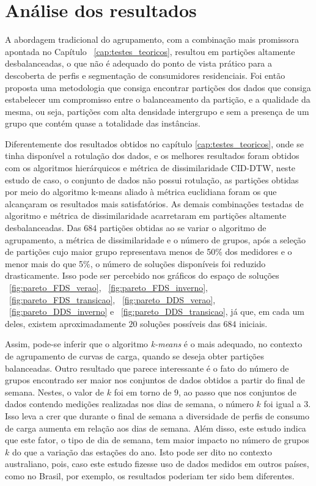 \section{Análise dos resultados}

A abordagem tradicional do agrupamento, com a combinação mais promissora apontada no Capítulo ~\ref{cap:testes_teoricos}, resultou em partições altamente desbalanceadas, o que não é adequado do ponto de vista prático para a descoberta de perfis e segmentação de consumidores residenciais. Foi então proposta uma metodologia que consiga encontrar partições dos dados que consiga estabelecer um compromisso entre o balanceamento da partição, e a qualidade da mesma, ou seja, partições com alta densidade intergrupo e sem a presença de um grupo que contém quase a totalidade das instâncias.

Diferentemente dos resultados obtidos no capítulo \ref{cap:testes_teoricos}, onde se tinha disponível a rotulação dos dados, e os melhores resultados foram obtidos com os algoritmos hierárquicos e métrica de dissimilaridade CID-DTW, neste estudo de caso, o conjunto de dados não possui rotulação, as partições obtidas por meio do algoritmo k-means aliado à métrica euclidiana foram os que alcançaram os resultados mais satisfatórios. As demais combinações testadas de algoritmo e métrica de dissimilaridade acarretaram em partições altamente desbalanceadas. Das $684$ partições obtidas ao se variar o algoritmo de agrupamento, a métrica de dissimilaridade e o número de grupos, após a seleção de partições cujo maior grupo representava menos de 50\% dos medidores e o menor mais do que 5\%, o número de soluções disponíveis foi reduzido drasticamente. Isso pode ser percebido nos gráficos do espaço de soluções ~\ref{fig:pareto_FDS_verao}, ~\ref{fig:pareto_FDS_inverno}, ~\ref{fig:pareto_FDS_transicao}, ~\ref{fig:pareto_DDS_verao}, ~\ref{fig:pareto_DDS_inverno} e ~\ref{fig:pareto_DDS_transicao},  já que, em cada um deles, existem aproximadamente $20$ soluções possíveis das $684$ iniciais.

Assim, pode-se inferir que o algoritmo \emph{k-means} é o mais adequado, no contexto de agrupamento de curvas de carga, quando se deseja obter partições balanceadas. Outro resultado que parece interessante é o fato do número de grupos encontrado ser maior nos conjuntos de dados obtidos a partir do final de semana. Nestes, o valor de $k$ foi em torno de $9$, ao passo que nos conjuntos de dados contendo medições realizadas nos dias de semana, o número $k$ foi igual a 3. Isso leva a crer que durante o final de semana a diversidade de perfis de consumo de carga aumenta em relação aos dias de semana. Além disso, este estudo indica que este fator, o tipo de dia de semana, tem maior impacto no número de grupos $k$ do que a variação das estações do ano. Isto pode ser dito no contexto australiano, pois, caso este estudo fizesse uso de dados medidos em outros países, como no Brasil, por exemplo, os resultados poderiam ter sido bem diferentes. 

